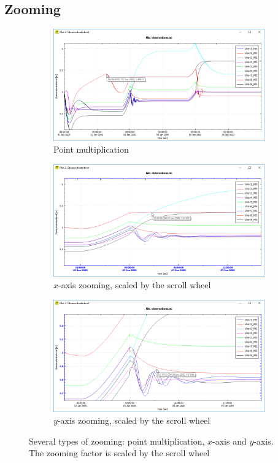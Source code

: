 \documentclass{deltares_memo}
\begin{document}
\subsection{Zooming}
\begin{figure}[H]
    \centering
    \begin{subfigure}{0.3\textwidth}
    \includegraphics[width=\textwidth]{pictures/plot_zoom_point_multiplication.png}
    \caption{Point multiplication\newline}
    \end{subfigure}
\hfill
    \begin{subfigure}{0.3\textwidth}
    \includegraphics[width=\textwidth]{pictures/plot_zoom_x_axis.png}
    \caption{$x$-axis zooming, scaled by the scroll wheel}
    \end{subfigure}
\hfill
    \begin{subfigure}{0.3\textwidth}
    \includegraphics[width=\textwidth]{pictures/plot_zoom_y_axis.png}
    \caption{$y$-axis zooming, scaled by the scroll wheel}
\end{subfigure}
\caption{Several types of zooming: point multiplication, $x$-axis and $y$-axis. The zooming factor is scaled by the scroll wheel}
\end{figure}
\end{document}

